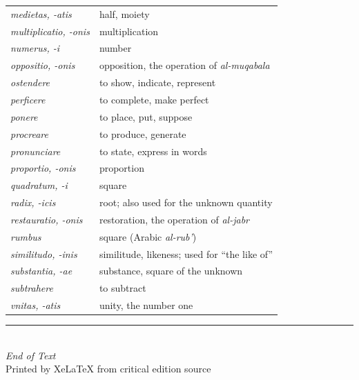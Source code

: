 \documentclass[11pt,a4paper]{book}
\begin{document}
\begin{longtable}{p{}p{}}
\textit{medietas, -atis} & half, moiety \\
\textit{multiplicatio, -onis} & multiplication \\
\textit{numerus, -i} & number \\
\textit{oppositio, -onis} & opposition, the operation of \textit{al-muqabala} \\
\textit{ostendere} & to show, indicate, represent \\
\textit{perficere} & to complete, make perfect \\
\textit{ponere} & to place, put, suppose \\
\textit{procreare} & to produce, generate \\
\textit{pronunciare} & to state, express in words \\
\textit{proportio, -onis} & proportion \\
\textit{quadratum, -i} & square \\
\textit{radix, -icis} & root; also used for the unknown quantity \\
\textit{restauratio, -onis} & restoration, the operation of \textit{al-jabr} \\
\textit{rumbus} & square (Arabic \textit{al-rub'}) \\
\textit{similitudo, -inis} & similitude, likeness; used for ``the like of'' \\
\textit{substantia, -ae} & substance, square of the unknown \\
\textit{subtrahere} & to subtract \\
\textit{vnitas, -atis} & unity, the number one \\
\bottomrule
\end{longtable}

\vfill
\begin{center}
\rule{0.5\textwidth}{0.4pt}\\[0.5cm]
{\small\textit{End of Text}}\\[0.3cm]
{\small Printed by XeLaTeX from critical edition source}
\end{center}
\end{document}
